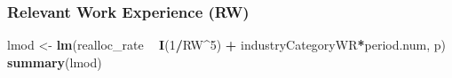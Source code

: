 \documentclass[
]{article}
\newenvironment{Shaded}{\begin{snugshade}}{\end{snugshade}}
\newcommand{\DecValTok}[1]{\textcolor[rgb]{0.00,0.00,0.81}{#1}}
\newcommand{\KeywordTok}[1]{\textcolor[rgb]{0.13,0.29,0.53}{\textbf{#1}}}
\newcommand{\NormalTok}[1]{#1}
\newcommand{\OperatorTok}[1]{\textcolor[rgb]{0.81,0.36,0.00}{\textbf{#1}}}
\newcommand{\StringTok}[1]{\textcolor[rgb]{0.31,0.60,0.02}{#1}}
\begin{document}
\hypertarget{relevant-work-experience-rw-1}{%
\subsubsection{Relevant Work Experience
(RW)}\label{relevant-work-experience-rw-1}}

\begin{Shaded}
\begin{Highlighting}[]
\NormalTok{lmod <-}\StringTok{ }\KeywordTok{lm}\NormalTok{(realloc_rate }\OperatorTok{~}\StringTok{ }\KeywordTok{I}\NormalTok{(}\DecValTok{1}\OperatorTok{/}\NormalTok{RW}\OperatorTok{^}\DecValTok{5}\NormalTok{) }\OperatorTok{+}\StringTok{ }\NormalTok{industryCategoryWR}\OperatorTok{*}\NormalTok{period.num, p)}
\KeywordTok{summary}\NormalTok{(lmod)}
\end{Highlighting}
\end{Shaded}
\end{document}
